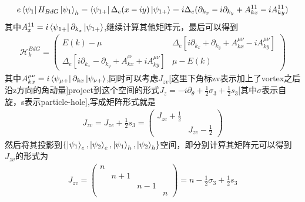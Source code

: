 \documentclass[22pt]{article}
\begin{document}
\begin{align}
	e\bra{\psi_1}H_{BdG}\ket{\psi_1}_h=\bra{\psi_{1+}}\Delta_e(x-iy)\ket{\psi_{1+}}=i\Delta_e(\partial_{k_x}-i\partial_{k_y}+A_{kx}^{11}-iA_{ky}^{11})
\end{align}
其中$A_x^{11}=i\bra{\psi_{1+}}\partial_{k_x}\ket{\psi_{1+}}$,继续计算其他矩阵元，最后可以得到
\begin{align}
	\nonumber
	\mathcal{H}_k^{BdG}=
	\begin{pmatrix}
		E(k)-\mu & \Delta_e[i\partial_{k_x}+\partial_{k_y}+A_{kx}^{\mu\nu}-iA_{ky}^{\mu\nu}]\\
		\Delta_e[i\partial_{k_x}-\partial_{k_y}+A_{kx}^{^{\mu\nu}}+iA_{ky}^{\mu\nu}] &\mu-E(k)
	\end{pmatrix}
\end{align}
其中$A_{kx}^{\mu\nu}=i\bra{\psi_{\mu+}}\partial_{kx}\ket{\psi_{\nu+}}$,同时可以考虑$J_{zv}$[这里下角标zv表示加上了vortex之后沿z方向的角动量]project到这个空间的形式$J_{z}=-i\partial_{\theta}+\frac{1}{2}\sigma_3+\frac{1}{2}s_3$[其中$\sigma$表示自旋，s表示particle-hole],写成矩阵形式就是
\begin{align}
	J_{zv}=J_{ze}+\frac{1}{2}s_3=
	\begin{pmatrix}
		J_{ze}+\frac{1}{2} &\\
		& J_{ze}-\frac{1}{2}
	\end{pmatrix}
\end{align}
然后将其投影到$\{\ket{\psi_1}_e,\ket{\psi_2}_e,\ket{\psi_1}_h,\ket{\psi_2}_h\}$空间，即分别计算其矩阵元可以得到$J_{zv}$的形式为
\begin{align}
	J_{zv}=
	\begin{pmatrix}
		n&&&\\
		&n+1&&\\
		&&n-1&\\
		&&&n
	\end{pmatrix}
	=n-\frac{1}{2}\sigma_3+\frac{1}{2}s_3
\end{align}
\end{document}
